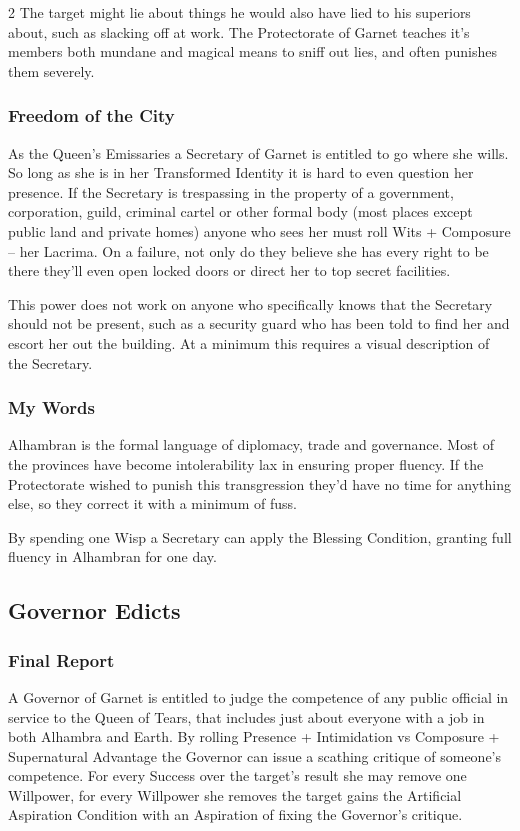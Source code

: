 \begin{multicols}{2}
The target might lie about things he would also have lied to his superiors about, such as slacking off at work. The Protectorate of Garnet teaches it's members both mundane and magical means to sniff out lies, and often punishes them severely.  

\subsubsection*{Freedom of the City}

As the Queen's Emissaries a Secretary of Garnet is entitled to go where she wills. So long as she is in her Transformed Identity it is hard to even question her presence. If the Secretary is trespassing in the property of a government, corporation, guild, criminal cartel or other formal body (most places except public land and private homes) anyone who sees her must roll Wits + Composure – her Lacrima. On a failure, not only do they believe she has every right to be there they'll even open locked doors or direct her to top secret facilities. 

This power does not work on anyone who specifically knows that the Secretary should not be present, such as a security guard who has been told to find her and escort her out the building. At a minimum this requires a visual description of the Secretary.

\subsubsection*{My Words}

Alhambran is the formal language of diplomacy, trade and governance. Most of the provinces have become intolerability lax in ensuring proper fluency. If the Protectorate wished to punish this transgression they'd have no time for anything else, so they correct it with a minimum of fuss.

By spending one Wisp a Secretary can apply the Blessing Condition, granting full fluency in Alhambran for one day. 

\subsection*{Governor Edicts}

\subsubsection*{Final Report}

A Governor of Garnet is entitled to judge the competence of any public official in service to the Queen of Tears, that includes just about everyone with a job in both Alhambra and Earth. By rolling Presence + Intimidation vs Composure + Supernatural Advantage the Governor can issue a scathing critique of someone's competence. For every Success over the target's result she may remove one Willpower, for every Willpower she removes the target gains the Artificial Aspiration Condition with an Aspiration of fixing the Governor's critique.


\end{multicols}
